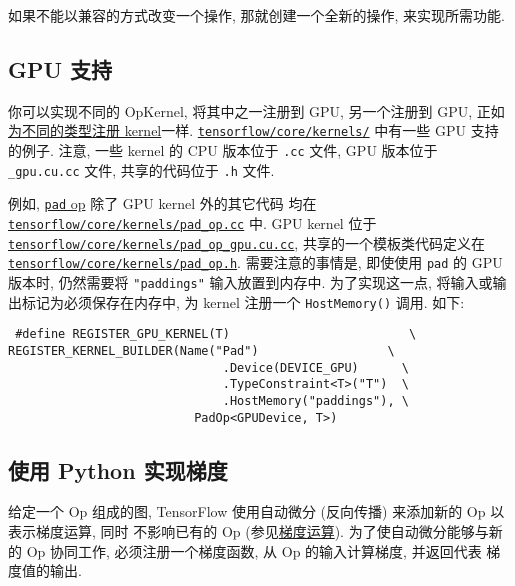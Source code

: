 如果不能以兼容的方式改变一个操作, 那就创建一个全新的操作,
来实现所需功能.

\subsection{GPU 支持 }\label{gpu-ux652fux6301}

你可以实现不同的 OpKernel, 将其中之一注册到 GPU, 另一个注册到 GPU,
正如\protect\hyperlink{Polymorphism}{为不同的类型注册 kernel}一样.
\href{https://tensorflow.googlesource.com/tensorflow/+/master/tensorflow/core/kernels/}{\texttt{tensorflow/core/kernels/}}
中有一些 GPU 支持的例子. 注意, 一些 kernel 的 CPU 版本位于 \texttt{.cc}
文件, GPU 版本位于 \texttt{\_gpu.cu.cc} 文件, 共享的代码位于 \texttt{.h}
文件.

例如,
\href{tensorflow-zh/SOURCE/api_docs/python/array_ops.md\#pad}{\texttt{pad}
op} 除了 GPU kernel 外的其它代码 均在
\href{https://tensorflow.googlesource.com/tensorflow/+/master/tensorflow/core/kernels/pad_op.cc}{\texttt{tensorflow/core/kernels/pad\_op.cc}}
中. GPU kernel 位于
\href{https://tensorflow.googlesource.com/tensorflow/+/master/tensorflow/core/kernels/pad_op_gpu.cu.cc}{\texttt{tensorflow/core/kernels/pad\_op\_gpu.cu.cc}},
共享的一个模板类代码定义在
\href{https://tensorflow.googlesource.com/tensorflow/+/master/tensorflow/core/kernels/pad_op.h}{\texttt{tensorflow/core/kernels/pad\_op.h}}.
需要注意的事情是, 即使使用 \texttt{pad} 的 GPU 版本时, 仍然需要将
\texttt{"paddings"} 输入放置到内存中. 为了实现这一点,
将输入或输出标记为必须保存在内存中, 为 kernel 注册一个
\texttt{HostMemory()} 调用. 如下:

\begin{verbatim}
 #define REGISTER_GPU_KERNEL(T)                         \
REGISTER_KERNEL_BUILDER(Name("Pad")                  \
                              .Device(DEVICE_GPU)      \
                              .TypeConstraint<T>("T")  \
                              .HostMemory("paddings"), \
                          PadOp<GPUDevice, T>)
\end{verbatim}

\subsection{使用 Python 实现梯度
}\label{ux4f7fux7528-python-ux5b9eux73b0ux68afux5ea6}

给定一个 Op 组成的图, TensorFlow 使用自动微分 (反向传播) 来添加新的 Op
以表示梯度运算, 同时 不影响已有的 Op
(参见\href{tensorflow-zh/SOURCE/api_docs/python/train.md\#gradient-computation}{梯度运算}).
为了使自动微分能够与新的 Op 协同工作, 必须注册一个梯度函数, 从 Op
的输入计算梯度, 并返回代表 梯度值的输出.


